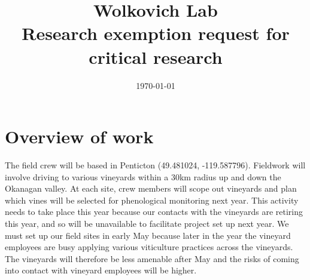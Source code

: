 \documentclass[11pt,letter]{article}
\begin{document}

\renewcommand{\refname}{\CHead{}}

\title{Wolkovich Lab \\ Research exemption request for critical research}
\date{\today}
\maketitle
\tableofcontents


\section{Overview of work}
The field crew will be based in Penticton (49.481024, -119.587796). Fieldwork will involve driving to various vineyards within a 30km radius up and down the Okanagan valley. At each site, crew members will scope out vineyards and plan which vines will be selected for phenological monitoring next year. This activity needs to take place this year because our contacts with the vineyards are retiring this year, and so will be unavailable to facilitate project set up next year. We must set up our field sites in early May because later in the year the vineyard employees are busy applying various viticulture practices across the vineyards. The vineyards will therefore be less amenable after May and the risks of coming into contact with vineyard employees will be higher.\\
\end{document}
